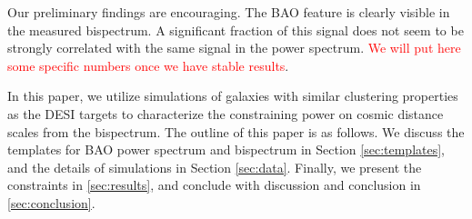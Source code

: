 Our preliminary findings are encouraging. The BAO feature is clearly visible in the measured bispectrum. A significant fraction of this signal does not seem to be strongly correlated with the same signal in the power spectrum. \textcolor{red}{We will put here some specific numbers once we have stable results}.

In this paper, we utilize simulations of galaxies with similar clustering properties as the DESI targets to characterize the constraining power on cosmic distance scales from the bispectrum. The outline of this paper is as follows. We discuss the templates for BAO power spectrum and bispectrum in Section \ref{sec:templates}, and the details of simulations in Section \ref{sec:data}. Finally, we present the constraints in \ref{sec:results}, and conclude with discussion and conclusion in \ref{sec:conclusion}.